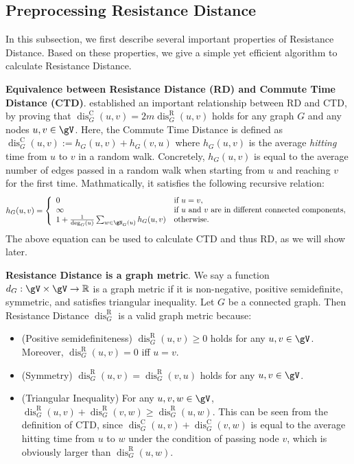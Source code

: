 \documentclass{article} %
\newcommand*{\disR}{\operatorname{dis}^\mathrm{R}}
\newcommand*{\disC}{\operatorname{dis}^\mathrm{C}}
\begin{document}
\subsection{Preprocessing Resistance Distance}
\label{sec:detail_of_rdwl}
In this subsection, we first describe several important properties of Resistance Distance. Based on these properties, we give a simple yet efficient algorithm to calculate Resistance Distance.

\textbf{Equivalence between Resistance Distance (RD) and Commute Time Distance (CTD)}. \citet{chandra1996electrical} established an important relationship between RD and CTD, by proving that $\disC_G(u,v)=2m\disR_G(u,v)$ holds for any graph $G$ and any nodes $u,v\in\gV$. Here, the Commute Time Distance is defined as $\disC_G(u,v):=h_G(u,v)+h_G(v,u)$ where $h_G(u,v)$ is the average \emph{hitting} time from $u$ to $v$ in a random walk. Concretely, $h_G(u,v)$ is equal to the average number of edges passed in a random walk when starting from $u$ and reaching $v$ for the first time. Mathmatically, it satisfies the following recursive relation:
\begin{equation}
\label{eq:commute_time}
    h_G(u,v)=\left\{\begin{array}{ll}
        0 & \text{if }u=v, \\
        \infty & \text{if }u\text{ and }v \text{ are in different connected components},\\
        1+\frac 1 {\deg_G(u)}\sum_{w\in\gN_G(u)}h_G(u,v) & \text{otherwise}.
    \end{array}\right.
\end{equation}
The above equation can be used to calculate CTD and thus RD, as we will show later.

\textbf{Resistance Distance is a graph metric}. We say a function $d_G:\gV\times\gV\to\mathbb R$ is a graph metric if it is non-negative, positive semidefinite, symmetric, and satisfies triangular inequality. Let $G$ be a connected graph. Then Resistance Distance $\disR_G$ is a valid graph metric because:
\begin{itemize}[topsep=0pt,leftmargin=30pt]
\setlength{\itemsep}{0pt}
    \item (Positive semidefiniteness) $\disR_G(u,v)\ge 0$ holds for any $u,v\in\gV$. Moreover, $\disR_G(u,v)= 0$ iff $u=v$.
    \item (Symmetry) $\disR_G(u,v)=\disR_G(v,u)$ holds for any $u,v\in\gV$.
    \item (Triangular Inequality) For any $u,v,w\in\gV$, $\disR_G(u,v)+\disR_G(v,w)\ge \disR_G(u,w)$. This can be seen from the definition of CTD, since $\disC_G(u,v)+\disC_G(v,w)$ is equal to the average hitting time from $u$ to $w$ under the condition of passing node $v$, which is obviously larger than $\disR_G(u,w)$.
\end{itemize}
\end{document}
